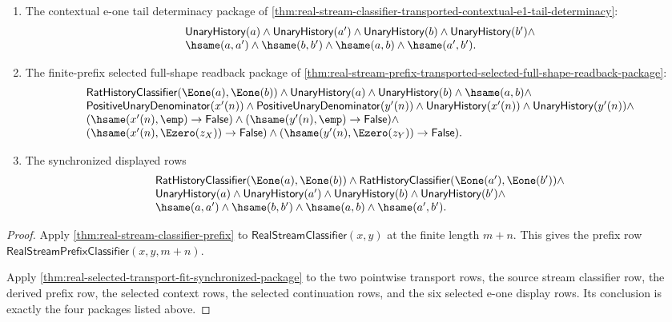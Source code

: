 \begin{theorem}
\begin{enumerate}
$$\begin{array}{l}
(\hsame(o_X(n),\Ezero(z_X))\to\mathsf{False})\land
(\hsame(o_Y(n),\Ezero(z_Y))\to\mathsf{False}),\\
\mathsf{UnaryHistory}(a)\land\mathsf{UnaryHistory}(b)\land\hsame(a,b).
\end{array}
$$
\item The contextual e-one tail determinacy package of
\autoref{thm:real-stream-classifier-transported-contextual-e1-tail-determinacy}:
$$
\begin{array}{l}
\mathsf{UnaryHistory}(a)\land
\mathsf{UnaryHistory}(a')\land
\mathsf{UnaryHistory}(b)\land
\mathsf{UnaryHistory}(b')\land\\
\hsame(a,a')\land
\hsame(b,b')\land
\hsame(a,b)\land
\hsame(a',b').
\end{array}
$$
\item The finite-prefix selected full-shape readback package of
\autoref{thm:real-stream-prefix-transported-selected-full-shape-readback-package}:
$$
\begin{array}{l}
\mathsf{RatHistoryClassifier}(\Eone(a),\Eone(b))\land
\mathsf{UnaryHistory}(a)\land \mathsf{UnaryHistory}(b)\land \hsame(a,b)\land\\
\mathsf{PositiveUnaryDenominator}(x'(n))\land
\mathsf{PositiveUnaryDenominator}(y'(n))\land
\mathsf{UnaryHistory}(x'(n))\land
\mathsf{UnaryHistory}(y'(n))\land\\
(\hsame(x'(n),\emp)\to\mathsf{False})\land
(\hsame(y'(n),\emp)\to\mathsf{False})\land\\
(\hsame(x'(n),\Ezero(z_X))\to\mathsf{False})\land
(\hsame(y'(n),\Ezero(z_Y))\to\mathsf{False}).
\end{array}
$$
\item The synchronized displayed rows
$$
\begin{array}{l}
\mathsf{RatHistoryClassifier}(\Eone(a),\Eone(b))\land
\mathsf{RatHistoryClassifier}(\Eone(a'),\Eone(b'))\land\\
\mathsf{UnaryHistory}(a)\land
\mathsf{UnaryHistory}(a')\land
\mathsf{UnaryHistory}(b)\land
\mathsf{UnaryHistory}(b')\land\\
\hsame(a,a')\land
\hsame(b,b')\land
\hsame(a,b)\land
\hsame(a',b').
\end{array}
$$
\end{enumerate}
\end{theorem}
\begin{proof}
Apply \autoref{thm:real-stream-classifier-prefix} to
$\mathsf{RealStreamClassifier}(x,y)$ at the finite length $m+n$. This gives the
prefix row $\mathsf{RealStreamPrefixClassifier}(x,y,m+n)$.

Apply \autoref{thm:real-selected-transport-fit-synchronized-package} to the two
pointwise transport rows, the source stream classifier row, the derived prefix
row, the selected context rows, the selected continuation rows, and the six
selected e-one display rows. Its conclusion is exactly the four packages listed
above.
\end{proof}

